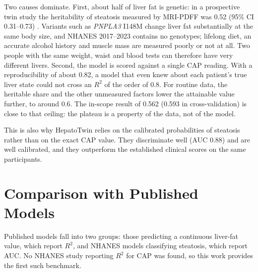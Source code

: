 Two causes dominate. First, about half of liver fat is genetic: in a prospective twin study the heritability of steatosis measured by MRI-PDFF was 0.52 (95\% CI 0.31--0.73) \cite{loomba2015heritability}. Variants such as \emph{PNPLA3} I148M change liver fat substantially at the same body size, and NHANES 2017--2023 contains no genotypes; lifelong diet, an accurate alcohol history and muscle mass are measured poorly or not at all. Two people with the same weight, waist and blood tests can therefore have very different livers. Second, the model is scored against a single CAP reading. With a reproducibility of about 0.82, a model that even knew about each patient's true liver state could not cross an $R^2$ of the order of 0.8. For routine data, the heritable share and the other unmeasured factors lower the attainable value further, to around 0.6. The in-scope result of 0.562 (0.593 in cross-validation) is close to that ceiling: the plateau is a property of the data, not of the model.

This is also why HepatoTwin relies on the calibrated probabilities of steatosis rather than on the exact CAP value. They discriminate well (AUC 0.88) and are well calibrated, and they outperform the established clinical scores on the same participants.

\section{Comparison with Published Models}
\label{sec:exp-compare}

Published models fall into two groups: those predicting a continuous liver-fat value, which report $R^2$, and NHANES models classifying steatosis, which report AUC. No NHANES study reporting $R^2$ for CAP was found, so this work provides the first such benchmark.

